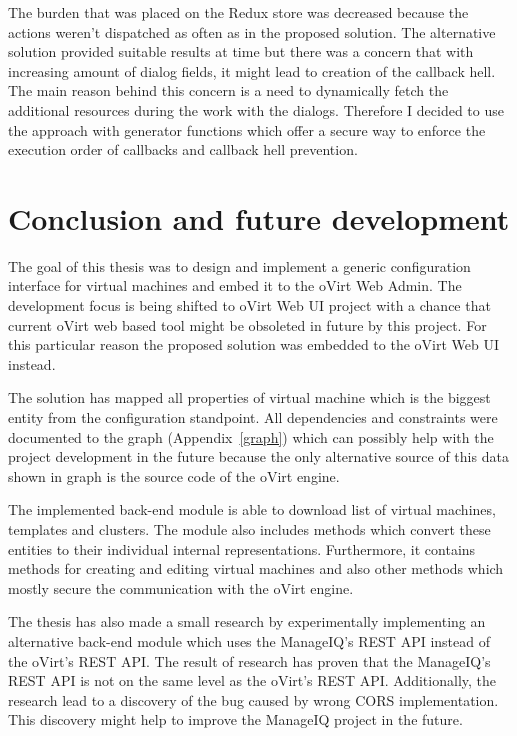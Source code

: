 The burden that was placed on the Redux store was decreased because the actions weren't dispatched as often as in the proposed solution. The alternative solution provided suitable results at time but there was a concern that with increasing amount of dialog fields, it might lead to creation of the callback hell. The main reason behind this concern is a need to dynamically fetch the additional resources during the work with the dialogs. Therefore I decided to use the approach with generator functions which offer a secure way to enforce the execution order of callbacks and callback hell prevention.


\chapter{Conclusion and future development}
The goal of this thesis was to design and implement a generic configuration interface for virtual machines and embed it to the oVirt Web Admin. The development focus is being shifted to oVirt Web UI project with a chance that current oVirt web based tool might be obsoleted in future by this project. For this particular reason the proposed solution was embedded to the oVirt Web UI instead.

The solution has mapped all properties of virtual machine which is the biggest entity from the configuration standpoint. All dependencies and constraints were documented to the graph (Appendix~\ref{graph}) which can possibly help with the project development in the future because the only alternative source of this data shown in graph is the source code of the oVirt engine.

The implemented back-end module is able to download list of virtual machines, templates and clusters. The module also includes methods which convert these entities to their individual internal representations. Furthermore, it contains methods for creating and editing virtual machines and also other methods which mostly secure the communication with the oVirt engine.

The thesis has also made a small research by experimentally implementing an alternative back-end module which uses the ManageIQ's REST API instead of the oVirt's REST API. The result of research has proven that the ManageIQ's REST API is not on the same level as the oVirt's REST API. Additionally, the research lead to a discovery of the bug caused by wrong CORS implementation. This discovery might help to improve the ManageIQ project in the future. 

